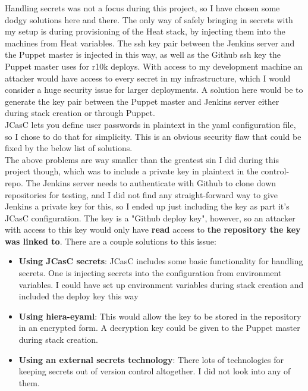 Handling secrets was not a focus during this project, so I have chosen some dodgy solutions here and there. The only way of safely bringing in secrets with my setup is during provisioning of the Heat stack, by injecting them into the machines from Heat variables. The ssh key pair between the Jenkins server and the Puppet master is injected in this way, as well as the Github ssh key the Puppet master uses for r10k deploys. With access to my development machine an attacker would have access to every secret in my infrastructure, which I would consider a huge security issue for larger deployments. A solution here would be to generate the key pair between the Puppet master and Jenkins server either during stack creation or through Puppet.
\\
JCasC lets you define user passwords in plaintext in the yaml configuration file, so I chose to do that for simplicity. This is an obvious security flaw that could be fixed by the below list of solutions.
\\
The above problems are way smaller than the greatest sin I did during this project though, which was to include a private key in plaintext in the control-repo. The Jenkins server needs to authenticate with Github to clone down repositories for testing, and I did not find any straight-forward way to give Jenkins a private key for this, so I ended up just including the key as part it's JCasC configuration. The key is a "Github deploy key", however, so an attacker with access to this key would only have \textbf{read} access to \textbf{the repository the key was linked to}. There are a couple solutions to this issue:
\\
\begin{itemize}  
\item \textbf{Using JCasC secrets}: JCasC includes some basic functionality for handling secrets. One is injecting secrets into the configuration from environment variables. I could have set up environment variables during stack creation and included the deploy key this way
\item \textbf{Using hiera-eyaml}: This would allow the key to be stored in the repository in an encrypted form. A decryption key could be given to the Puppet master during stack creation.
\item \textbf{Using an external secrets technology}: There lots of technologies for keeping secrets out of version control altogether. I did not look into any of them.
\end{itemize}

